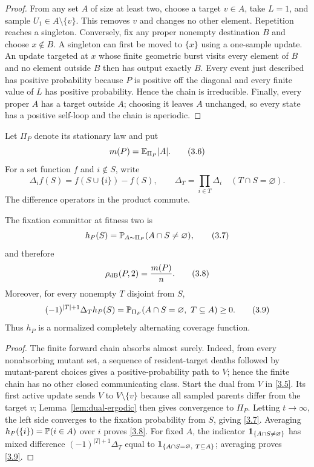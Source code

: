\begin{proof}
From any set $A$ of size at least two, choose a target $v\in A$, take $L=1$,
and sample $U_1\in A\setminus\{v\}$.  This removes $v$ and changes no other
element.  Repetition reaches a singleton.  Conversely, fix any proper
nonempty destination $B$ and choose $x\notin B$.  A singleton can first be
moved to $\{x\}$ using a one-sample update.  An update targeted at $x$ whose
finite geometric burst visits every element of $B$ and no element outside
$B$ then has output exactly $B$.  Every event just described has positive
probability because $P$ is positive off the diagonal and every finite value
of $L$ has positive probability.  Hence the chain is irreducible.  Finally,
every proper $A$ has a target outside $A$; choosing it leaves $A$ unchanged,
so every state has a positive self-loop and the chain is aperiodic.
\end{proof}

Let $\Pi_P$ denote its stationary law and put
\[
 m(P)=\mathbb E_{\Pi_P}|A|.                                         \tag{3.6}\label{3.6}
\]
For a set function $f$ and $i\notin S$, write
\[
 \Delta_i f(S)=f(S\cup\{i\})-f(S),\qquad
 \Delta_T=\prod_{i\in T}\Delta_i
 \quad(T\cap S=\varnothing).                                \tag{3.6a}\label{3.6a}
\]
The difference operators in the product commute.

\begin{proposition}\label{prop:coverage}
The fixation committor at fitness two is
\[
 h_P(S)=\mathbb P_{A\sim\Pi_P}(A\cap S\ne\varnothing),            \tag{3.7}\label{3.7}
\]
and therefore
\[
 \rho_{\mathrm{dB}}(P,2)=\frac{m(P)}n.                              \tag{3.8}\label{3.8}
\]
Moreover, for every nonempty $T$ disjoint from $S$,
\[
 (-1)^{|T|+1}\Delta_T h_P(S)
 =\mathbb P_{\Pi_P}(A\cap S=\varnothing,\ T\subseteq A)\ge0.      \tag{3.9}\label{3.9}
\]
Thus $h_P$ is a normalized completely alternating coverage function.
\end{proposition}

\begin{proof}
The finite forward chain absorbs almost surely.  Indeed, from every
nonabsorbing mutant set, a sequence of resident-target deaths followed by
mutant-parent choices gives a positive-probability path to $V$; hence the
finite chain has no other closed communicating class.  Start the dual from $V$ in
\eqref{3.5}.  Its first active update sends $V$ to $V\setminus\{v\}$ because
all sampled parents differ from the target $v$; Lemma~\ref{lem:dual-ergodic}
then gives convergence to $\Pi_P$.  Letting $t\to\infty$, the left side
converges to the fixation probability from $S$, giving \eqref{3.7}.
Averaging $h_P(\{i\})=\mathbb P(i\in A)$ over $i$ proves
\eqref{3.8}.  For fixed $A$, the indicator
$\mathbf 1_{\{A\cap S\ne\varnothing\}}$ has mixed difference
$(-1)^{|T|+1}\Delta_T$ equal to
$\one_{\{A\cap S=\varnothing,\ T\subseteq A\}}$; averaging proves
\eqref{3.9}.
\end{proof}

